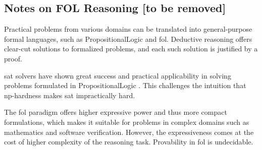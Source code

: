 
\subsection{Notes on FOL Reasoning [to be removed]}


Practical problems from various domains can be translated into general-purpose formal languages,
such as \gls{PropositionalLogic} and \gls{fol}.
Deductive reasoning offers clear-cut solutions to formalized problems,
and each such solution is justified by a proof.




\Gls{sat} solvers have shown great success and practical applicability in solving problems formulated in \gls{PropositionalLogic} \cite{DBLP:series/faia/336}.
This challenges the intuition that \acrshort{np}-hardness makes \gls{sat} impractically hard.

The \gls{fol} paradigm offers higher expressive power and thus more compact formulations,
which makes it suitable for problems in complex domains such as mathematics and software verification.
However, the expressiveness comes at the cost of higher complexity of the reasoning task.
Provability in \gls{fol} is undecidable.

